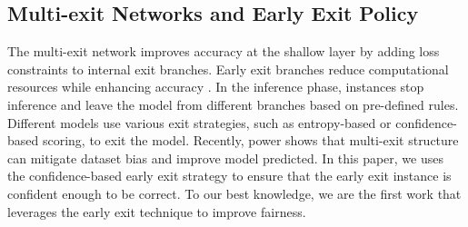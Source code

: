 \subsection{Multi-exit Networks and Early Exit Policy} %
The multi-exit network improves accuracy at the shallow layer by adding loss constraints to internal exit branches. Early exit branches reduce computational resources while enhancing accuracy \cite{kaya2019shallow}. In the inference phase, instances stop inference and leave the model from different branches based on pre-defined rules. Different models use various exit strategies, such as entropy-based or confidence-based scoring, to exit the model\cite{teerapittayanon2016branchynet,kaya2019shallow}. Recently, power\cite{shrestha2022occamnets} shows that multi-exit structure can mitigate dataset bias and improve model predicted. In this paper, we uses the confidence-based early exit strategy to ensure that the early exit instance is confident enough to be correct. To our best knowledge, we are the first work that leverages the early exit technique to improve fairness.




